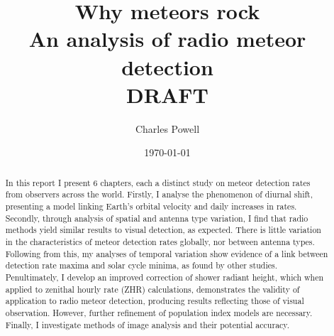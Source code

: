 \documentclass[a4paper,10pt,notitlepage, twocolumn]{report}
\title{\huge Why meteors rock \\ \large An analysis of radio meteor detection \\ \vspace{1em} \huge {\bf DRAFT}}
\author{Charles Powell}
\begin{document}
	

\begin{titlingpage}
\date{\today}
\maketitle

\vspace{10em}
\begin{abstract}
	In this report I present 6 chapters, each a distinct study on meteor detection rates from observers across the world. Firstly, I analyse the phenomenon of diurnal shift, presenting a model linking Earth's orbital velocity and daily increases in rates. Secondly, through analysis of spatial and antenna type variation, I find that radio methods yield similar results to visual detection, as expected. There is little variation in the characteristics of meteor detection rates globally, nor between antenna types. Following from this, my analyses of temporal variation show evidence of a link between detection rate maxima and solar cycle minima, as found by other studies. Penultimately, I develop an improved correction of shower radiant height, which when applied to zenithal hourly rate (ZHR) calculations, demonstrates the validity of application to radio meteor detection, producing results reflecting those of visual observation. However, further refinement of population index models are necessary. Finally, I investigate methods of image analysis and their potential accuracy.
\end{abstract}
\end{titlingpage}

\tableofcontents









\onecolumn

\begin{appendices}

\end{appendices}
\printbibliography
\end{document}
